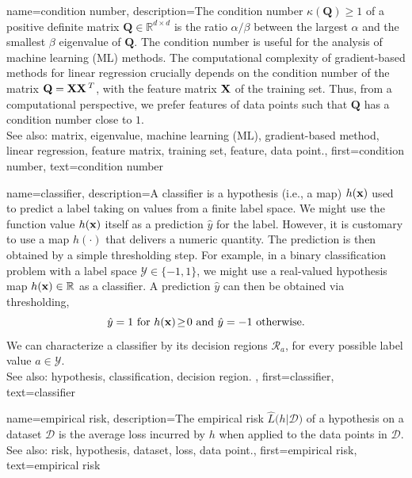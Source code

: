 {
{name={condition number},
	description={The condition number $\kappa(\mathbf{Q}) \geq 1$ of a 
		positive definite matrix $\mathbf{Q} \in \mathbb{R}^{d \times d}$ is the ratio 
		$\alpha /\beta  $ between the largest $\alpha$ and the smallest $\beta$ eigenvalue of 
		$\mathbf{Q}$. The condition number is useful for the analysis of machine learning (ML) methods. 
		The computational complexity of gradient-based methods for linear regression crucially depends on the 
		condition number of the matrix $\mathbf{Q} = {\bf X} {\bf X}\,^{T}$, with the feature matrix ${\bf X}$ 
		of the training set. Thus, from a computational perspective, we prefer features of 
		data points such that $\mathbf{Q}$ has a condition number close to $1$.
					\\ 
		See also: matrix, eigenvalue, machine learning (ML), gradient-based method, linear regression, feature matrix, training set, feature, data point.},
	first={condition number},
	text={condition number} 
}

{name={classifier},
	description={A classifier is a hypothesis (i.e., a map) $h({\bf x})$ 
		used to predict a label taking on values from a finite label space. We might use the 
		function value $h({\bf x})$ itself as a prediction $\hat{y}$ for 
		the label. However, it is customary to use a map $h(\cdot)$ that delivers 
		a numeric quantity. The prediction is then obtained by a simple thresholding step. 
		For example, in a binary classification problem with a label space $\mathcal{Y} \in  \{ -1,1\}$, 
		we might use a real-valued hypothesis map $h({\bf x}) \in \mathbb{R}$ 
		as a classifier. A prediction $\hat{y}$ can then be obtained via thresholding,  
		 \begin{equation} 
		 	\label{equ_def_threshold_bin_classifier_dict}
		 	\hat{y} =1   \mbox{ for } h({\bf x})\!\geq\!0 \mbox{ and } 	\hat{y} =-1  \mbox{ otherwise.}
	 		\end{equation}
 		We can characterize a classifier by its decision regions $\mathcal{R}_{a}$, for 
 		every possible label value $a \in \mathcal{Y}$.
					\\ 
		See also: hypothesis, classification, decision region. },
	first={classifier},
	text={classifier} 
}

{name={empirical risk},
  description={The empirical risk $\widehat{L}\big(h|\mathcal{D}\big)$ 
  	of a hypothesis on a dataset $\mathcal{D}$ is the average loss incurred 
  	by $h$ when applied to the data points in $\mathcal{D}$.
				\\ 
		See also: risk, hypothesis, dataset, loss, data point.},
  first={empirical risk},
  text={empirical risk} 
}

}
